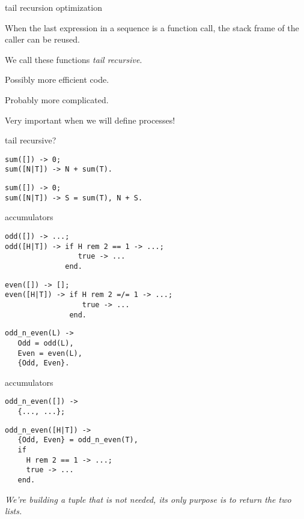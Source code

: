 \begin{frame}{tail recursion optimization}

When the last expression in a sequence is a function call, the stack
frame of the caller can be reused.

\pause\vspace{20pt}We call these functions {\em tail recursive}.

\pause\vspace{20pt}Possibly more efficient code.

\pause\vspace{20pt}Probably more complicated.

\pause\vspace{20pt}Very important when we will define processes!

\end{frame}

\begin{frame}[fragile]{tail recursive?}

\begin{verbatim}
sum([]) -> 0;
sum([N|T]) -> N + sum(T).
\end{verbatim}

\pause
\begin{verbatim}
sum([]) -> 0;
sum([N|T]) -> S = sum(T), N + S.
\end{verbatim}

\end{frame}

\begin{frame}[fragile]{accumulators}


\begin{verbatim}
odd([]) -> ...;
odd([H|T]) -> if H rem 2 == 1 -> ...; 
                 true -> ... 
              end.
\end{verbatim}
\pause
\begin{verbatim}
even([]) -> [];
even([H|T]) -> if H rem 2 =/= 1 -> ...; 
                  true -> ...
               end.
\end{verbatim}
\pause

\begin{verbatim}
odd_n_even(L) -> 
   Odd = odd(L),
   Even = even(L),
   {Odd, Even}.
\end{verbatim}
\end{frame}

\begin{frame}[fragile]{accumulators}

\begin{verbatim}
odd_n_even([]) ->
   {..., ...};
\end{verbatim}
\pause
\begin{verbatim}
odd_n_even([H|T]) -> 
   {Odd, Even} = odd_n_even(T),
   if 
     H rem 2 == 1 -> ...; 
     true -> ... 
   end.
\end{verbatim}

\vspace{40pt}
{\em We're building a tuple that is not needed, its only purpose is to return the two lists.}

\end{frame}



